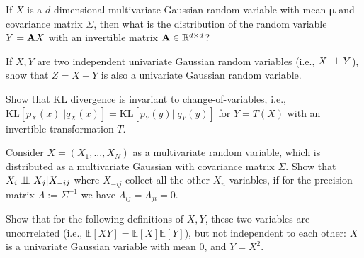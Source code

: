 \begin{question} 
\label{q:linear_transform_gaussian}

If $X$ is a $d$-dimensional multivariate Gaussian random variable with mean $\bm{\mu}$ and covariance matrix $\Sigma$, then what is the distribution of the random variable $Y = \mathbf A X$ with an invertible matrix $\mathbf A \in \mathbb{R}^{d \times d}$? 
\end{question}

\begin{question}
\label{q:sum_of_gaussians}

If $X, Y$ are two independent univariate Gaussian random variables (i.e., $X \perp\!\!\!\perp Y$), show that $Z = X+Y$ is also a univariate Gaussian random variable.
\end{question}

\begin{question}
\label{q:kl_change_of_variable}

Show that KL divergence is invariant to change-of-variables, i.e., $\mathrm{KL}[p_X(x) || q_X(x)] = \mathrm{KL}[p_Y(y) || q_Y(y)]$ for $Y = T(X)$ with an invertible transformation $T$.
\end{question}

\begin{question}
\label{q:independence_of_gaussians}

Consider $X = (X_1, ..., X_N)$ as a multivariate random variable, which is distributed as a multivariate Gaussian with covariance matrix $\Sigma$. Show that $X_i \perp\!\!\!\perp X_j | X_{-ij}$ where $X_{-ij}$ collect all the other $X_n$ variables, if for the precision matrix $\Lambda := \Sigma^{-1}$ we have $\Lambda_{ij} = \Lambda_{ji} = 0$.
\end{question}

\begin{question}
\label{q:uncorrelated}

Show that for the following definitions of $X, Y$, these two variables are uncorrelated (i.e., $\mathbb{E}[XY] = \mathbb{E}[X]\mathbb{E}[Y]$), but not independent to each other: $X$ is a univariate Gaussian variable with mean 0, and $Y = X^2$. 

\end{question}
